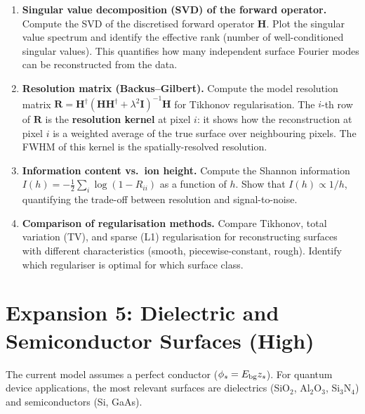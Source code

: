 \documentclass[11pt,a4paper]{article}
\begin{document}
\begin{enumerate}[label=\textbf{I\arabic*}, leftmargin=*]

    \item \textbf{Singular value decomposition (SVD) of the forward operator.}
    Compute the SVD of the discretised forward operator $\mathbf{H}$. Plot the singular value spectrum and identify the effective rank (number of well-conditioned singular values). This quantifies how many independent surface Fourier modes can be reconstructed from the data.

    \item \textbf{Resolution matrix (Backus--Gilbert).}
    Compute the model resolution matrix $\mathbf{R} = \mathbf{H}^\dagger(\mathbf{H}\mathbf{H}^\dagger + \lambda^2\mathbf{I})^{-1}\mathbf{H}$ for Tikhonov regularisation. The $i$-th row of $\mathbf{R}$ is the \textbf{resolution kernel} at pixel $i$: it shows how the reconstruction at pixel $i$ is a weighted average of the true surface over neighbouring pixels. The FWHM of this kernel is the spatially-resolved resolution.

    \item \textbf{Information content vs.\ ion height.}
    Compute the Shannon information $I(h) = -\frac{1}{2}\sum_i \log(1 - R_{ii})$ as a function of $h$. Show that $I(h) \propto 1/h$, quantifying the trade-off between resolution and signal-to-noise.

    \item \textbf{Comparison of regularisation methods.}
    Compare Tikhonov, total variation (TV), and sparse (L1) regularisation for reconstructing surfaces with different characteristics (smooth, piecewise-constant, rough). Identify which regulariser is optimal for which surface class.

\end{enumerate}

\section{Expansion 5: Dielectric and Semiconductor Surfaces (High)}

The current model assumes a perfect conductor ($\phi_s = E_{\rm bg}z_s$). For quantum device applications, the most relevant surfaces are dielectrics (SiO$_2$, Al$_2$O$_3$, Si$_3$N$_4$) and semiconductors (Si, GaAs).
\end{document}
